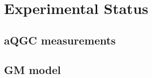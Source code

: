 
\section{Experimental Status} %
\label{sec:experimental_status}

\subsection{aQGC measurements} %
\label{sub:aqgc_measurements}


\subsection{GM model} %
\label{sub:gm_model}








